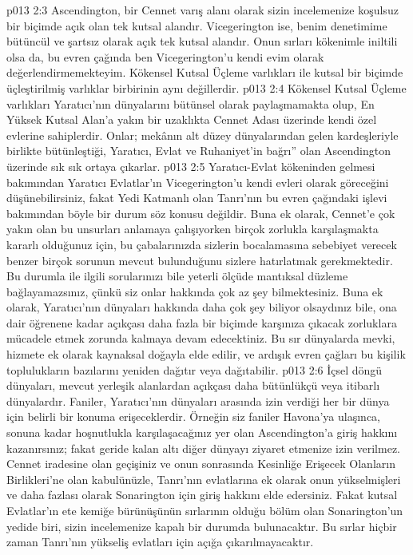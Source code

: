 \vs p013 2:3 Ascendington, bir Cennet varış alanı olarak sizin incelemenize koşulsuz bir biçimde açık olan tek kutsal alandır. Vicegerington ise, benim denetimime bütüncül ve şartsız olarak açık tek kutsal alandır. Onun sırları kökenimle iniltili olsa da, bu evren çağında ben Vicegerington’u kendi evim olarak değerlendirmemekteyim. Kökensel Kutsal Üçleme varlıkları ile kutsal bir biçimde üçleştirilmiş varlıklar birbirinin aynı değillerdir.
\vs p013 2:4 Kökensel Kutsal Üçleme varlıkları Yaratıcı’nın dünyalarını bütünsel olarak paylaşmamakta olup, En Yüksek Kutsal Alan’a yakın bir uzaklıkta Cennet Adası üzerinde kendi özel evlerine sahiplerdir. Onlar; mekânın alt düzey dünyalarından gelen kardeşleriyle birlikte bütünleştiği, Yaratıcı, Evlat ve Ruhaniyet’in bağrı” olan Ascendington üzerinde sık sık ortaya çıkarlar.
\vs p013 2:5 Yaratıcı\hyp{}Evlat kökeninden gelmesi bakımından Yaratıcı Evlatlar’ın Vicegerington’u kendi evleri olarak göreceğini düşünebilirsiniz, fakat Yedi Katmanlı olan Tanrı’nın bu evren çağındaki işlevi bakımından böyle bir durum söz konusu değildir. Buna ek olarak, Cennet’e çok yakın olan bu unsurları anlamaya çalışıyorken birçok zorlukla karşılaşmakta kararlı olduğunuz için, bu çabalarınızda sizlerin bocalamasına sebebiyet verecek benzer birçok sorunun mevcut bulunduğunu sizlere hatırlatmak gerekmektedir. Bu durumla ile ilgili sorularınızı bile yeterli ölçüde mantıksal düzleme bağlayamazsınız, çünkü siz onlar hakkında çok az şey bilmektesiniz. Buna ek olarak, Yaratıcı’nın dünyaları hakkında daha çok şey biliyor olsaydınız bile, ona dair  öğrenene kadar açıkçası daha fazla bir biçimde karşınıza çıkacak zorluklara mücadele etmek zorunda kalmaya devam edecektiniz. Bu sır dünyalarda mevki, hizmete ek olarak kaynaksal doğayla elde edilir, ve ardışık evren çağları bu kişilik toplulukların bazılarını yeniden dağıtır veya dağıtabilir.
\vs p013 2:6 İçsel döngü dünyaları, mevcut yerleşik alanlardan açıkçası daha bütünlükçü veya itibarlı dünyalardır. Faniler, Yaratıcı’nın dünyaları arasında izin verdiği her bir dünya için belirli bir konuma erişeceklerdir. Örneğin siz faniler Havona’ya ulaşınca, sonuna kadar hoşnutlukla karşılaşacağınız yer olan Ascendington’a giriş hakkını kazanırsınız; fakat geride kalan altı diğer dünyayı ziyaret etmenize izin verilmez. Cennet iradesine olan geçişiniz ve onun sonrasında Kesinliğe Erişecek Olanların Birlikleri’ne olan kabulünüzle, Tanrı’nın evlatlarına ek olarak onun yükselmişleri ve daha fazlası olarak Sonarington için giriş hakkını elde edersiniz. Fakat kutsal Evlatlar’ın ete kemiğe bürünüşünün sırlarının olduğu bölüm olan Sonarington’un yedide biri, sizin incelemenize kapalı bir durumda bulunacaktır. Bu sırlar hiçbir zaman Tanrı’nın yükseliş evlatları için açığa çıkarılmayacaktır.
